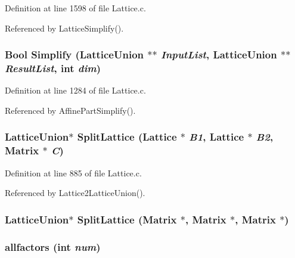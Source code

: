 Definition at line 1598 of file Lattice.c.

Referenced by Lattice\-Simplify().

\subsubsection{\setlength{\rightskip}{0pt plus 5cm}Bool Simplify (Lattice\-Union $\ast$$\ast$ {\em Input\-List}, Lattice\-Union $\ast$$\ast$ {\em Result\-List}, int {\em dim})\hspace{0.3cm}{\tt  [static]}}\label{Lattice_8c_a28}




Definition at line 1284 of file Lattice.c.

Referenced by Affine\-Part\-Simplify().

\subsubsection{\setlength{\rightskip}{0pt plus 5cm}Lattice\-Union$\ast$ Split\-Lattice (Lattice $\ast$ {\em B1}, Lattice $\ast$ {\em B2}, Matrix $\ast$ {\em C})}\label{Lattice_8c_a22}




Definition at line 885 of file Lattice.c.

Referenced by Lattice2Lattice\-Union().

\subsubsection{\setlength{\rightskip}{0pt plus 5cm}Lattice\-Union$\ast$ Split\-Lattice (Matrix $\ast$, Matrix $\ast$, Matrix $\ast$)}\label{Lattice_8c_a19}


\subsubsection{ allfactors (int {\em num})\hspace{0.3cm}{\tt  [static]}}\label{Lattice_8c_a0}




